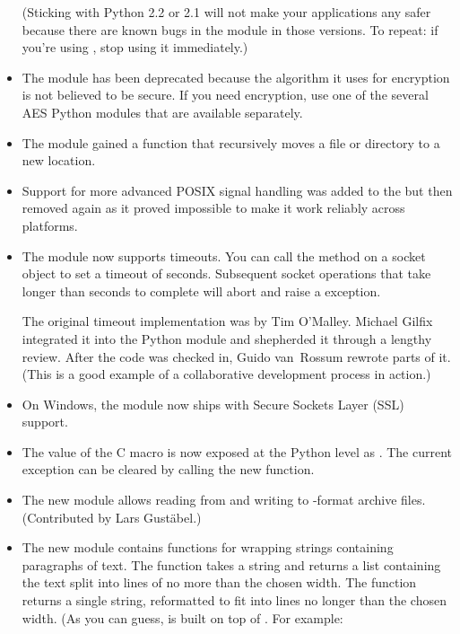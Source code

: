 \documentclass{howto}
\begin{document}
\begin{itemize}
(Sticking with Python 2.2 or 2.1 will not make your applications any
safer because there are known bugs in the  module in
those versions.  To repeat: if you're using , stop using
it immediately.)

\item The  module has been deprecated because the 
  algorithm it uses for encryption is not believed to be secure.  If
  you need encryption, use one of the several AES Python modules
  that are available separately.

\item The  module gained a  function that recursively moves a file or directory to a new
location.

\item Support for more advanced POSIX signal handling was added
to the  but then removed again as it proved impossible
to make it work reliably across platforms.

\item The  module now supports timeouts.  You
can call the  method on a socket object to
set a timeout of  seconds.  Subsequent socket operations that
take longer than  seconds to complete will abort and raise a
 exception.

The original timeout implementation was by Tim O'Malley.  Michael
Gilfix integrated it into the Python  module and
shepherded it through a lengthy review.  After the code was checked
in, Guido van~Rossum rewrote parts of it.  (This is a good example of
a collaborative development process in action.)

\item On Windows, the  module now ships with Secure 
Sockets Layer (SSL) support.

\item The value of the C  macro is now
exposed at the Python level as .  The current
exception can be cleared by calling the new 
function.

\item The new  module 
allows reading from and writing to -format archive files.
(Contributed by Lars Gust\"abel.)

\item The new  module contains functions for wrapping
strings containing paragraphs of text.  The  function takes a string and returns a list containing
the text split into lines of no more than the chosen width.  The
 function returns a single
string, reformatted to fit into lines no longer than the chosen width.
(As you can guess,  is built on top of
.  For example:


\end{itemize}
\end{document}
